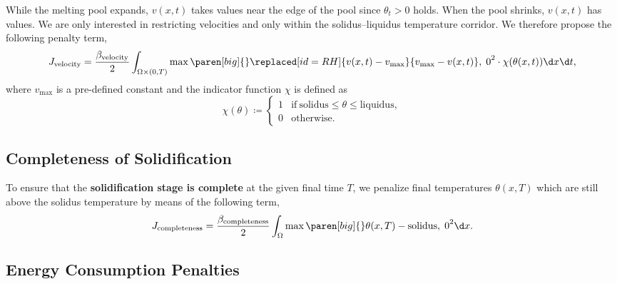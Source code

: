 While the melting pool expands, $v(x,t)$ takes  values near the edge of the pool since $\theta_t > 0$ holds.
When the pool shrinks, $v(x,t)$ has  values.
We are only interested in restricting  velocities and only within the solidus--liquidus temperature corridor.
We therefore propose the following penalty term,
\begin{equation} \label{eq:J_velocity}
	J_{\text{velocity}} 
	= 
	\frac{\beta_\text{velocity}}{2} \int_{\Omega \times (0,T)} \max \paren[big]\{\}{\replaced[id=RH]{v(x,t) - v_{\max}}{v_{\max} - v(x,t)}, \; 0}^2 \cdot \chi(\theta(x,t)) \d x \d t
	,
\end{equation}
where $v_{\max}$ is a pre-defined constant and the indicator function $\chi$ is defined as
\begin{equation}
	\chi(\theta) 
	\coloneqq 
	\begin{cases}
		1 & \text{if}\ \text{solidus} \le \theta \le \text{liquidus}
		, 
		\\
		0 & \text{otherwise}
		.
	\end{cases}
\end{equation}


\subsection{Completeness of Solidification}

To ensure that the \textbf{solidification stage is complete} at the given final time $T$, we penalize final temperatures $\theta(x,T)$ which are still above the solidus temperature by means of the following term,
\begin{equation} \label{eq:J_completeness}
	J_{\text{completeness}} 
	=
	\frac{\beta_\text{completeness}}{2} \int_{\Omega} \max \paren[big]\{\}{\theta(x, T) - \text{solidus}, \; 0}^2 \d x
	.
\end{equation}


\subsection{Energy Consumption Penalties}

